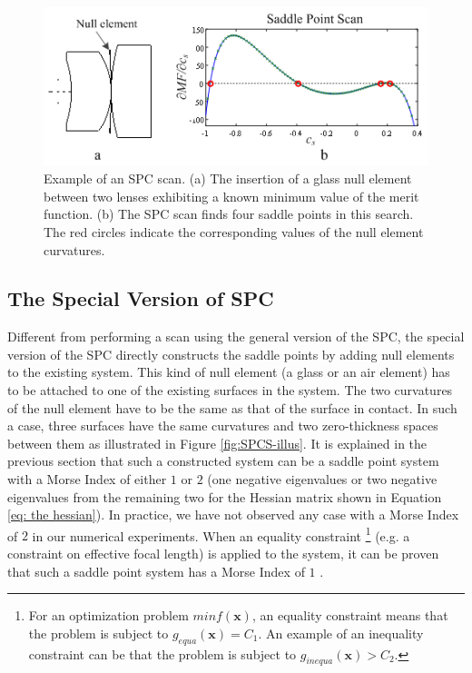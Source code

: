 \begin{figure}[h!]
    \centering
    \includegraphics[scale=0.8]{chapter-2/figures/SPCscan.png}
    \caption{Example of an SPC scan. (a) The insertion of a glass null element between two lenses exhibiting a known minimum value of the merit function. (b) The SPC scan finds four saddle points in this search. The red circles indicate the corresponding values of the null element curvatures.}
    \label{fig:SPCscan}
\end{figure}

\subsection{The Special Version of SPC}
\label{SPC_Special}
Different from performing a scan using the general version of the SPC, the special version of the SPC directly constructs the saddle points by adding null elements to the existing system. This kind of null element (a glass or an air element) has to be attached to one of the existing surfaces in the system. The two curvatures of the null element have to be the same as that of the surface in contact. In such a case, three surfaces have the same curvatures and two zero-thickness spaces between them as illustrated in Figure \ref{fig:SPCS-illus}. It is explained in the previous section that such a constructed system can be a saddle point system with a Morse Index of either $1$ or $2$ (one negative eigenvalues or two negative eigenvalues from the remaining two for the Hessian matrix shown in Equation \ref{eq: the hessian}). In practice, we have not observed any case with a Morse Index of $2$ in our numerical experiments. When an equality constraint \footnote{For an optimization problem $min f(\mathbf{x})$, an equality constraint means that the problem is subject to $g_{equa}(\mathbf{x})=C_1$. An example of an inequality constraint can be that the problem is subject to $g_{inequa}(\mathbf{x}) > C_2$.} (e.g. a constraint on effective focal length) is applied to the system, it can be proven that such a saddle point system has a Morse Index of $1$ \cite{BociortSPCSexplained}.

